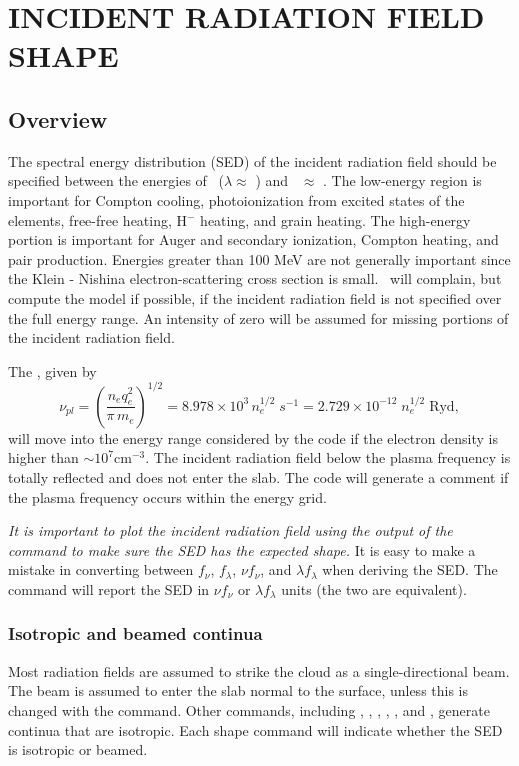 \chapter{INCIDENT RADIATION FIELD SHAPE}
\label{sec:IncidentContinuumShape}

\section{Overview}

The spectral energy distribution (SED) of the
incident radiation field should be specified
between the energies of \emm\ ($\lambda \approx$ \emmcm )
and \egamrymev \ $\approx$ \egamry .
The low-energy region is important for Compton cooling,
photoionization
from excited states of the elements, free-free heating, H$^-$ heating,
and grain heating.
The high-energy portion is important for Auger and secondary
ionization, Compton heating, and pair production.
Energies greater than
100 MeV are not generally important since the Klein - Nishina
electron-scattering cross section is small.
\Cloudy\ will complain, but compute
the model if possible, if the
incident radiation field is not specified over the full energy range.
An intensity of zero will be assumed for missing portions of the
incident radiation field.

The , given by
\begin{equation}
\nu _{pl}  = \left( {\frac{{n_e q_e^2 }}{{\pi \,m_e }}} \right)^{1/2}  =
8.978 \times 10^3 \,n_e^{1/2} \;s^{ - 1}  = 2.729 \times 10^{ - 12}
\;n_e^{1/2} \;{\mathrm{Ryd}},%
\end{equation}
will move into the energy range considered by the code if the electron
density is higher than $\sim 10^7 \mathrm{cm}^{-3}$.
The incident radiation field below the
plasma frequency is totally reflected and does not enter the slab.
The code will generate a comment if the plasma frequency occurs within
the energy grid.

\emph{It is important to plot the incident radiation
field using the output of the
 command to make sure the SED has the expected shape.}
It is easy to make a mistake in converting between $f_\nu$, $f_\lambda$,
$\nu f_\nu$, and $\lambda f_\lambda$ when deriving the SED.
The  command will report the SED in 
$\nu f_\nu$ or $\lambda f_\lambda$ units (the two are equivalent).

\subsection{Isotropic and beamed continua}
Most radiation fields are assumed to strike the cloud as a
single-directional beam.
The beam is assumed to enter the slab normal to
the surface, unless this is changed with the
 command.
Other commands, including
, ,
, ,
, and ,
generate continua that are isotropic.
Each shape command will indicate whether the SED is isotropic or beamed.

